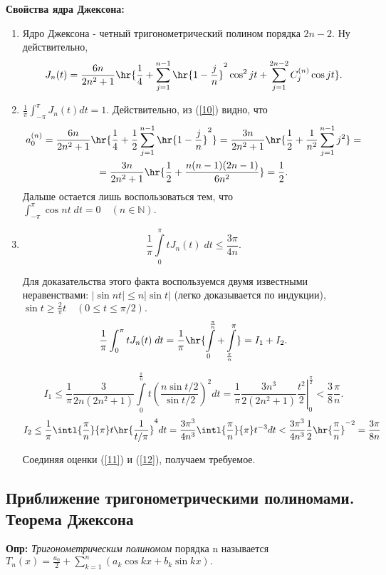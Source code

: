 \documentclass[a4paper]{article}
\begin{document}
\noindent\textbf{Свойства ядра Джексона:}
\begin{enumerate}
\item
Ядро Джексона - четный тригонометрический полином порядка $2n-2.$
Ну действительно,
\begin{equation}\label{10}
J_n(t)=\frac{6n}{2n^2+1}\hr{\frac14+\sum_{j=1}^{n-1}
\hr{1-\frac jn}^2\cos^2 jt+\sum_{j=1}^{2n-2}C_j^{(n)}\cos
jt}.
\end{equation}
\item
$\frac1{\pi}\int_{-\pi}^{\pi}J_n(t)dt=1.$ Действительно, из
(\ref{10}) видно, что
\begin{multline*}
a_0^{(n)}=\frac{6n}{2n^2+1}\hr{\frac14+\frac12\sum_{j=1}^{n-1}
\hr{1-\frac jn}^2}=\frac{3n}{2n^2+1}\hr{\frac12+\frac1{n^2}\sum_{j=1}^{n-1}j^2}=\\
=\frac{3n}{2n^2+1}\hr{\frac12+\frac{n(n-1)(2n-1)}{6n^2}}=\frac12.
\end{multline*}
Дальше остается лишь воспользоваться тем, что
$\int_{-\pi}^{\pi}\cos nt \;dt=0\quad(n\in\mathbb{N}).$
\item
$$\frac1{\pi}\int\limits_0^{\pi} tJ_n(t)\;dt\le\frac{3\pi}{4n}.$$

Для доказательства этого факта воспользуемся двумя известными
неравенствами: $|\sin nt|\le n|\sin t|$ (легко доказывается по
индукции), $\sin t\ge \frac2{\pi}t\quad (0\le t\le\pi/2).$
$$\frac1{\pi}\int_0^{\pi}
tJ_n(t)\;dt=\frac1{\pi}\hr{\int\limits_0^{\frac{\pi}{n}}+\int\limits_{\frac{\pi}{n}}^{\pi}}=I_1+I_2.$$

\begin{equation}\label{11}
I_1\le\frac1{\pi}\frac{3}{2n(2n^2+1)}\int\limits_0^{\frac{\pi}{n}}
t\left(\frac{n\sin t/2}{\sin t/2}\right)^2dt=
\left.\frac1{\pi}\frac{3n^3}{2(2n^2+1)}\frac{t^2}2\right|_0^{\frac{\pi}2}<\frac38\frac{\pi}n.
\end{equation}
\begin{equation}\label{12}
I_2\le\frac1{\pi}\intl{\frac{\pi}{n}}{\pi}
t\hr{\frac1{t/\pi}}^4dt=\frac{3\pi^3}{4n^3}\intl{\frac{\pi}{n}}{\pi}t^{-3}dt<\frac{3\pi^3}{4n^3}\frac12\hr{\frac{\pi}n}^{-2}=\frac{3\pi}{8n}
\end{equation}

Соединяя оценки (\ref{11}) и (\ref{12}), получаем требуемое.
\end{enumerate}

\subsection{Приближение тригонометрическими полиномами. Теорема Джексона}
\textbf{Опр:} \emph{Тригонометрическим полиномом} порядка n
называется $T_n(x)=\frac{a_0}2+\sum_{k=1}^n (a_k\cos kx+b_k\sin
kx).$
\end{document}
